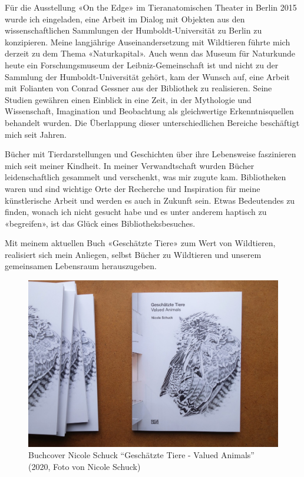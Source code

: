 \documentclass[a4paper,
fontsize=11pt,
oneside,
numbers=noperiodatend,
parskip=half-,
bibliography=totoc,
final
]{scrartcl}
\begin{document}
Für die Ausstellung «On the Edge» im Tieranatomischen Theater in Berlin
2015 wurde ich eingeladen, eine Arbeit im Dialog mit Objekten aus den
wissenschaftlichen Sammlungen der Humboldt-Universität zu Berlin zu
konzipieren. Meine langjährige Auseinandersetzung mit Wildtieren führte
mich derzeit zu dem Thema «Naturkapital». Auch wenn das Museum für
Naturkunde heute ein Forschungsmuseum der Leibniz-Gemeinschaft ist und
nicht zu der Sammlung der Humboldt-Universität gehört, kam der Wunsch
auf, eine Arbeit mit Folianten von Conrad Gessner aus der Bibliothek zu
realisieren. Seine Studien gewähren einen Einblick in eine Zeit, in der
Mythologie und Wissenschaft, Imagination und Beobachtung als
gleichwertige Erkenntnisquellen behandelt wurden. Die Überlappung dieser
unterschiedlichen Bereiche beschäftigt mich seit Jahren.

Bücher mit Tierdarstellungen und Geschichten über ihre Lebensweise
faszinieren mich seit meiner Kindheit. In meiner Verwandtschaft wurden
Bücher leidenschaftlich gesammelt und verschenkt, was mir zugute kam.
Bibliotheken waren und sind wichtige Orte der Recherche und Inspiration
für meine künstlerische Arbeit und werden es auch in Zukunft sein. Etwas
Bedeutendes zu finden, wonach ich nicht gesucht habe und es unter
anderem haptisch zu «begreifen», ist das Glück eines
Bibliotheksbesuches.

Mit meinem aktuellen Buch «Geschätzte Tiere» zum Wert von Wildtieren,
realisiert sich mein Anliegen, selbst Bücher zu Wildtieren und unserem
gemeinsamen Lebensraum herauszugeben.

\begin{figure}
\centering
\includegraphics{img/image1.jpg}
\caption{Buchcover Nicole Schuck \enquote{Geschätzte Tiere - Valued
Animals} (2020, Foto von Nicole Schuck)}
\end{figure}
\end{document}
